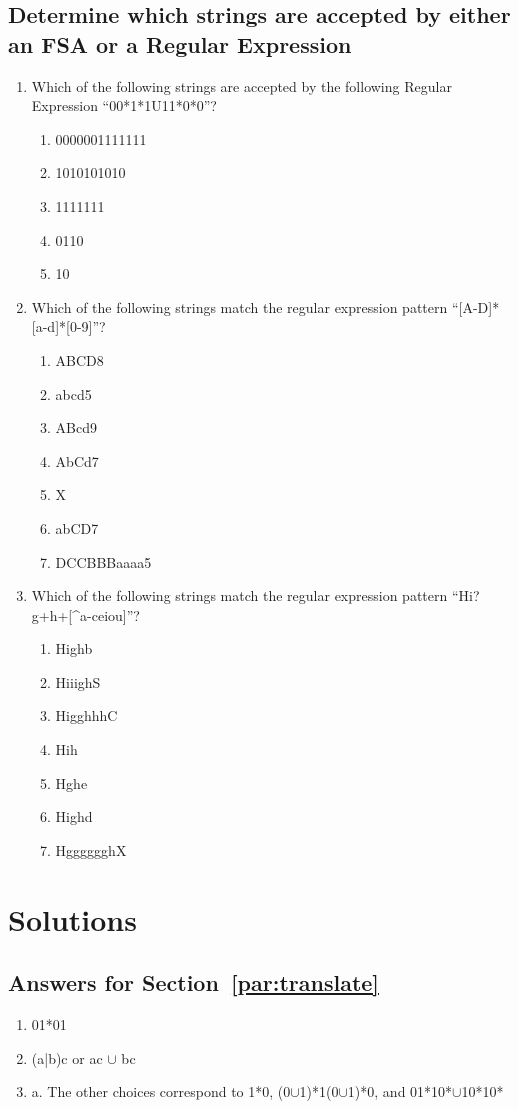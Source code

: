 \documentclass{pset_template}
\begin{document}
\subsection{Determine which strings are accepted by either an FSA or a Regular Expression}
\label{par:accepted}
\begin{enumerate}
\item Which of the following strings are accepted by the following Regular Expression     ``00*1*1U11*0*0''?
    \begin{enumerate}
    \item 0000001111111
    \item 1010101010
    \item 1111111
    \item 0110
    \item 10
    \end{enumerate}
\item Which of the following strings match the regular expression
pattern ``[A-D]*[a-d]*[0-9]''?
    \begin{enumerate}
    \item ABCD8
    \item abcd5
    \item ABcd9
    \item AbCd7
    \item X
    \item abCD7
    \item DCCBBBaaaa5
    \end{enumerate}
\item Which of the following strings match the regular expression
pattern ``Hi?g+h+[\string^a-ceiou]''?
    \begin{enumerate}
    \item Highb
    \item HiiighS
    \item HigghhhC
    \item Hih
    \item Hghe
    \item Highd
    \item HgggggghX
    \end{enumerate}
\end{enumerate}

\section{Solutions}

\subsection{Answers for Section~\ref{par:translate}}
\begin{enumerate}
\item 01*01
\item (a|b)c or ac $\cup$ bc
\item a. The other choices correspond to 1*0, (0$\cup$1)*1(0$\cup$1)*0, and 01*10*$\cup$10*10*
\end{enumerate}
\end{document}
